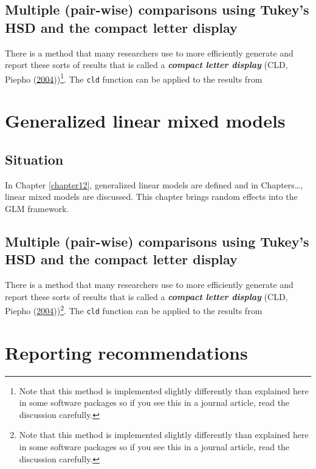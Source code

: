 \documentclass[
]{book}
\begin{document}
\hypertarget{section13-2}{%
\section{Multiple (pair-wise) comparisons using Tukey's HSD and the compact letter display}\label{section13-2}}

\indent There is a method that many researchers use to more efficiently generate and
report these sorts of results that is called a \textbf{\emph{compact letter display}} 
(CLD, Piepho (\protect\hyperlink{ref-Piepho2004}{2004}))\footnote{Note that this method is implemented slightly differently than explained here in some software packages so if you see this in a journal article, read the discussion carefully.}. The \texttt{cld} function can be applied to the results from

\hypertarget{chapter14}{%
\chapter{Generalized linear mixed models}\label{chapter14}}

\hypertarget{section14-1}{%
\section{Situation}\label{section14-1}}

In Chapter \ref{chapter12}, generalized linear models are defined and in Chapters\ldots, linear mixed models are discussed. This chapter brings random effects into the GLM framework.

\hypertarget{section14-2}{%
\section{Multiple (pair-wise) comparisons using Tukey's HSD and the compact letter display}\label{section14-2}}

\indent There is a method that many researchers use to more efficiently generate and
report these sorts of results that is called a \textbf{\emph{compact letter display}} 
(CLD, Piepho (\protect\hyperlink{ref-Piepho2004}{2004}))\footnote{Note that this method is implemented slightly differently than explained here in some software packages so if you see this in a journal article, read the discussion carefully.}. The \texttt{cld} function can be applied to the results from

\hypertarget{chapter15}{%
\chapter{Reporting recommendations}\label{chapter15}}
\end{document}
